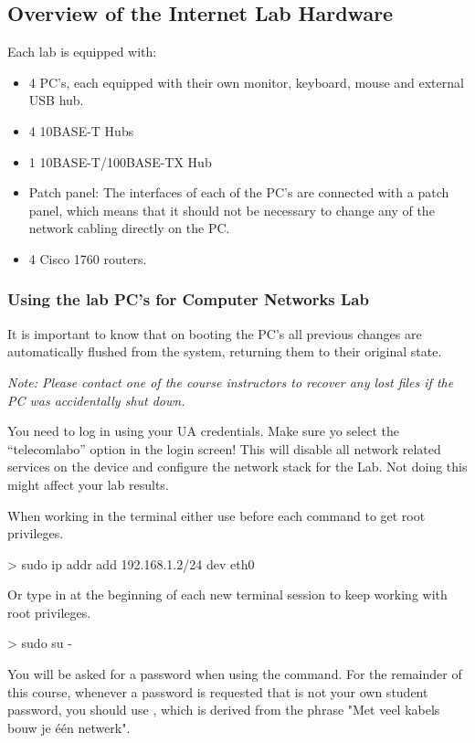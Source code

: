 \newpage
\subsection{Overview of the Internet Lab Hardware}

Each lab is equipped with:
\begin{itemize}
	\item 4 PC's, each equipped with their own monitor, keyboard, mouse and external USB hub. 
	\item 4 10BASE-T Hubs
	\item 1 10BASE-T/100BASE-TX Hub
	\item Patch panel: The interfaces of each of the PC's are connected with a patch panel, which means that it should not be necessary to change any of the network cabling directly on the PC.
	\item 4 Cisco 1760 routers.
\end{itemize}

\subsubsection*{Using the lab PC's for Computer Networks Lab}

It is important to know that on booting the PC's all previous changes are automatically flushed from the system, returning them to their original state.

\emph{Note: Please contact one of the course instructors to recover any lost files if the PC was accidentally shut down.}

You need to log in using your UA credentials. Make sure yo select the ``telecomlabo'' option in the login screen! This will disable all network related services on the device and configure the network stack for the Lab. Not doing this might affect your lab results.

When working in the terminal either use  before each command to get root privileges.

\begin{cmdblock}
	> sudo ip addr add 192.168.1.2/24 dev eth0
\end{cmdblock}

Or type in  at the beginning of each new terminal session to keep working with root privileges.

\begin{cmdblock}
	> sudo su -
\end{cmdblock}

You will be asked for a password when using the  command. For the remainder of this course, whenever a password is requested that is not your own student password, you should use , which is derived from the phrase "Met veel kabels bouw je één netwerk".

